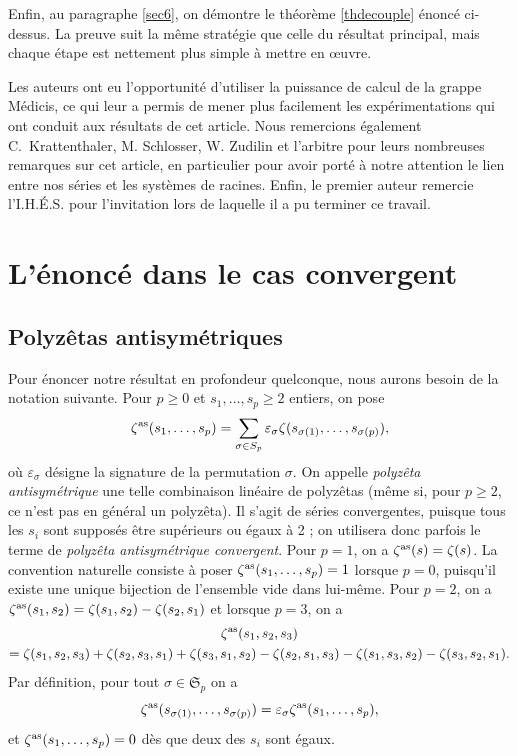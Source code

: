 \documentclass[12pt,francais, reqno]{smfart}
\numberwithin{equation}{section}
\newcommand{\eps}{\varepsilon}
\newcommand{\zetaantisym}{\zeta^{{\rm as}}}
\begin{document}
Enfin, au paragraphe \ref{sec6}, on d\'emontre le th\'eor\`eme \ref{thdecouple} \'enonc\'e ci-dessus. 
La preuve suit la m\^eme strat\'egie que celle du r\'esultat principal, mais chaque 
\'etape est nettement plus simple \`a mettre en {\oe}uvre. 

\bigskip

 Les auteurs ont eu l'opportunit\'e d'utiliser 
la puissance de calcul de la grappe M\'edicis, ce qui leur a permis de mener plus facilement les
exp\'erimentations qui ont conduit aux r\'esultats de cet article. Nous remercions \'egalement C.~Krattenthaler, M. Schlosser, W. Zudilin et l'arbitre 
pour leurs nombreuses remarques sur cet article, en particulier pour avoir port\'e \`a notre 
attention le lien entre nos s\'eries et les syst\`emes de racines. Enfin, le premier auteur remercie l'I.H.\'E.S. pour l'invitation lors de laquelle il a pu terminer ce travail. 


\section{L'\'enonc\'e dans le cas convergent} \label{sec2}

\subsection{Polyz\^etas antisym\'etriques} \label{subsec21}

Pour \'enoncer notre r\'esultat en profondeur quelconque, nous aurons besoin de la 
notation suivante. Pour $p \geq 0$ et $s_1, \ldots, s_p \geq 2$ entiers, on pose
$$\zetaantisym (s_1, \ldots, s_p) =  \sum_{\sigma\in\mathfrak{S}_p} \eps_{\sigma} 
\zeta(s_{\sigma(1)}, \ldots, s_{\sigma(p)}) ,$$
o\`u $\eps_{\sigma} $ d\'esigne la signature de la permutation $\sigma$. 
On appelle {\em polyz\^eta antisym\'etrique} une telle combinaison lin\'eaire de polyz\^etas 
(m\^eme si, pour $p \geq 2$, ce n'est pas en g\'en\'eral un polyz\^eta). Il s'agit de s\'eries 
convergentes, puisque tous les $s_i$ sont suppos\'es \^etre sup\'erieurs ou \'egaux \`a 2 ; on 
utilisera donc parfois le terme de {\em polyz\^eta antisym\'etrique convergent}. Pour $p=1$, on 
a $\zetaantisym (s) = \zeta(s)$. La convention naturelle consiste \`a poser $\zetaantisym (s_1, 
\ldots, s_p) = 1$ lorsque $p=0$, puisqu'il existe une unique bijection de l'ensemble vide dans lui-m\^eme.  Pour $p=2$, on a 
$\zetaantisym (s_1, s_2) = \zeta(s_1, s_2) - \zeta(s_2, s_1)$ 
et lorsque $p=3$, on a 
\begin{multline*}
\zetaantisym (s_1, s_2, s_3) 
\\
= \zeta(s_1, s_2, s_3) + \zeta(s_2, s_3, s_1) +  \zeta(s_3, s_1, s_2)
- \zeta(s_2, s_1, s_3) - \zeta(s_1, s_3, s_2) -  \zeta(s_3, s_2, s_1).
\end{multline*} 
Par d\'efinition, pour tout $\sigma\in\mathfrak{S}_p$ on a 
$$ \zetaantisym(s_{\sigma(1)}, \ldots, s_{\sigma(p)}) =  \eps_{\sigma} \zetaantisym (s_1, \ldots, s_p), $$
et $\zetaantisym (s_1, \ldots, s_p) = 0$ d\`es que deux des $s_i$ sont \'egaux. 
\end{document}
